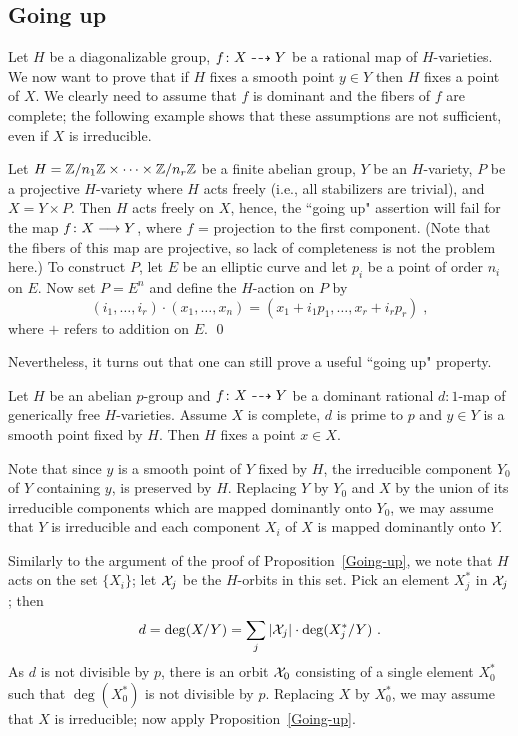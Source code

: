 \subsection*{Going up}

Let $H$ be a diagonalizable group,
$f\colon X \dasharrow Y$ be a rational map of $H$-varieties. We now want to
prove that if $H$ fixes a smooth point $y \in Y$ then $H$ fixes a point
of $X$. We clearly need to assume that $f$ is dominant
and the fibers of $f$ are complete; the following example shows that
these assumptions are not sufficient, even if $X$ is irreducible.

\begin{example}
Let $H = {\Bbb Z}/n_1{\Bbb Z} \times \dots \times {\Bbb Z}/n_r{\Bbb Z} $ 
be a finite abelian group, $Y$ be an $H$-variety, 
$P$ be a projective $H$-variety where $H$ acts freely (i.e., all stabilizers
are trivial), and $X = Y \times P$. Then $H$ acts freely on $X$,
hence, the ``going up" assertion will fail for the map $f \colon X \longrightarrow Y$,
where $f$ = projection to the first component.
(Note that the fibers of this map are projective, so lack of completeness is
not the problem here.) 
To construct $P$, let $E$ be an elliptic curve and let 
$p_i$ be a point of order $n_i$ on $E$. Now set $P = E^n$ 
and define the $H$-action on $P$ by
\[ (i_1, \dots, i_r) \cdot (x_1, \ldots, x_n) = (x_1 + i_1p_1,
\dots, x_r + i_r p_r) \; , \]
where $+$ refers to addition on $E$.
\qed
\end{example}

Nevertheless, it turns out that one can still prove 
a useful ``going up" property.  

\begin{prop} \label{prop6.3} 
Let $H$ be an abelian $p$-group 
and $f\colon X \dasharrow Y$ be a dominant rational $d:1$-map
of generically free $H$-varieties. Assume $X$ is complete,
$d$ is prime to $p$ and $y \in Y$ is a smooth point 
fixed by $H$. Then $H$ fixes a point $x \in X$.
\end{prop}

\begin{pf}
Note that since $y$ is a smooth point of $Y$ fixed by $H$, the
irreducible component $Y_0$ of $Y$ containing $y$, is preserved by $H$.
Replacing $Y$ by $Y_0$ and $X$ by the union of its
irreducible components which are mapped dominantly onto  $Y_0$, we may
assume that $Y$ is irreducible and each component $X_i$ of $X$ is mapped
dominantly onto $Y$.

Similarly to the argument of the proof of Proposition~\ref{Going-up},
we note that $H$ acts on the set $\{X_i\}$;
let ${\cal X}_j$ be the $H$-orbits in this set.
Pick an element $X_j^*$ in ${\cal X}_j$; then
\[
d=\deg(X/Y)=\sum_j|\cX_j|\cdot\deg(X_j^*/Y)\ .
\]
As $d$ is not divisible by $p$, there is an orbit ${\cal X}_0$ consisting
of a single element $X_0^*$ such that $\deg(X_0^*)$ is not divisible
by $p$.
Replacing $X$ by $X_0^*$, we may assume that $X$ is irreducible; now
apply Proposition~\ref{Going-up}.
\end{pf} 

